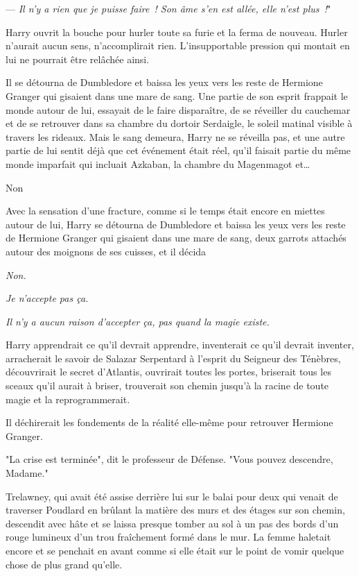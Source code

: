 --- \emph{Il n'y a rien que je puisse faire~! Son âme s'en est allée, elle n'est plus~!}"

Harry ouvrit la bouche pour hurler toute sa furie et la ferma de nouveau. Hurler n'aurait aucun sens, n'accomplirait rien. L'insupportable pression qui montait en lui ne pourrait être relâchée ainsi.

Il se détourna de Dumbledore et baissa les yeux vers les reste de Hermione Granger qui gisaient dans une mare de sang. Une partie de son esprit frappait le monde autour de lui, essayait de le faire disparaître, de se réveiller du cauchemar et de se retrouver dans sa chambre du dortoir Serdaigle, le soleil matinal visible à travers les rideaux. Mais le sang demeura, Harry ne se réveilla pas, et une autre partie de lui sentit déjà que cet événement était réel, qu'il faisait partie du même monde imparfait qui incluait Azkaban, la chambre du Magenmagot et…

Non

Avec la sensation d'une fracture, comme si le temps était encore en miettes autour de lui, Harry se détourna de Dumbledore et baissa les yeux vers les reste de Hermione Granger qui gisaient dans une mare de sang, deux garrots attachés autour des moignons de ses cuisses, et il décida

\emph{Non.}

\emph{Je n'accepte pas ça.}

\emph{Il n'y a aucun raison d'accepter ça, pas quand la magie existe.}

Harry apprendrait ce qu'il devrait apprendre, inventerait ce qu'il devrait inventer, arracherait le savoir de Salazar Serpentard à l'esprit du Seigneur des Ténèbres, découvrirait le secret d'Atlantis, ouvrirait toutes les portes, briserait tous les sceaux qu'il aurait à briser, trouverait son chemin jusqu'à la racine de toute magie et la reprogrammerait.

Il déchirerait les fondements de la réalité elle-même pour retrouver Hermione Granger.

\later

"La crise est terminée", dit le professeur de Défense. "Vous pouvez descendre, Madame."

Trelawney, qui avait été assise derrière lui sur le balai pour deux qui venait de traverser Poudlard en brûlant la matière des murs et des étages sur son chemin, descendit avec hâte et se laissa presque tomber au sol à un pas des bords d'un rouge lumineux d'un trou fraîchement formé dans le mur. La femme haletait encore et se penchait en avant comme si elle était sur le point de vomir quelque chose de plus grand qu'elle.

